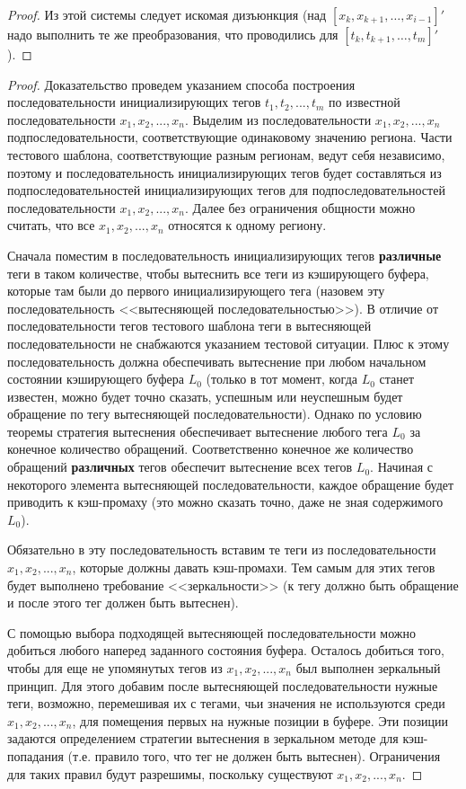 \begin{proof}
  Из этой системы следует искомая дизъюнкция (над $[x_k, x_{k+1}, \dots, x_{i-1}]'$
  надо выполнить те же преобразования, что проводились для $[t_k, t_{k+1}, \dots, t_m]'$).
\end{proof}

\theoremtext{\ref{mirror_fullness}}{\FullnessMirror}
\begin{proof}
  Доказательство проведем указанием способа построения
  последовательности инициализирующих тегов $t_1, t_2, ..., t_m$ по
  известной последовательности $x_1, x_2, ..., x_n$. Выделим из
  последовательности $x_1, x_2,..., x_n$ подпоследовательности,
  соответствующие одинаковому значению региона. Части тестового
  шаблона, соответствующие разным регионам, ведут себя независимо,
  поэтому и последовательность инициализирующих тегов будет
  составляться из подпоследовательностей инициализирующих тегов для
  подпоследовательностей последовательности $x_1, x_2, ..., x_n$.
  Далее без ограничения общности можно считать, что все $x_1, x_2,
  ..., x_n$ относятся к одному региону.

  Сначала поместим в последовательность инициализирующих тегов
  \textbf{различные} теги в таком количестве, чтобы вытеснить все теги из
  кэширующего буфера, которые там были до первого инициализирующего
  тега (назовем эту последовательность <<вытесняющей последовательностью>>).
  В отличие от последовательности тегов тестового шаблона теги в
  вытесняющей последовательности не снабжаются указанием тестовой
  ситуации. Плюс к этому последовательность должна обеспечивать
  вытеснение при любом начальном состоянии кэширующего буфера $L_0$
  (только в тот момент, когда $L_0$ станет известен, можно будет
  точно сказать, успешным или неуспешным будет обращение по тегу
  вытесняющей последовательности). Однако по условию теоремы
  стратегия вытеснения обеспечивает вытеснение любого тега $L_0$ за
  конечное количество обращений. Соответственно конечное же
  количество обращений \textbf{различных} тегов обеспечит вытеснение
  всех тегов $L_0$. Начиная с некоторого элемента вытесняющей последовательности,
  каждое обращение будет приводить к кэш-промаху (это можно сказать
  точно, даже не зная содержимого $L_0$).

  Обязательно в эту последовательность вставим те теги из
  последовательности $x_1, x_2, ..., x_n$, которые должны давать
  кэш-промахи. Тем самым для этих тегов будет выполнено требование
  <<зеркальности>> (к тегу должно быть обращение и после этого тег
  должен быть вытеснен).

  С помощью выбора подходящей вытесняющей последовательности можно
  добиться любого наперед заданного состояния буфера. Осталось добиться
  того, чтобы для еще не упомянутых тегов из $x_1,
  x_2, ..., x_n$ был выполнен зеркальный принцип. Для этого добавим
  после вытесняющей последовательности нужные теги, возможно,
  перемешивая их с тегами, чьи значения не используются среди $x_1,
  x_2, ..., x_n$, для помещения первых на нужные позиции в буфере.
  Эти позиции задаются определением стратегии вытеснения в зеркальном
  методе для кэш-попадания (т.е. правило того, что тег не должен быть
  вытеснен). Ограничения для таких правил будут разрешимы, поскольку
  существуют $x_1, x_2, ..., x_n$.
\end{proof}

